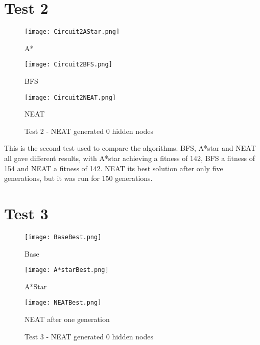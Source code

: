 \documentclass{kththesis}
\begin{document}
\section{Test 2}
 
\begin{figure}[h]
{\centering
 
\begin{minipage}{0.3\textwidth}
\centering
\texttt{[image: Circuit2AStar.png]}
\caption{A*}
\end{minipage}\hfill
\begin{minipage}{0.3\textwidth}
\centering
\texttt{[image: Circuit2BFS.png]}
\caption{BFS}
\end{minipage}\hfill
\begin{minipage}{0.3\textwidth}
\centering
\texttt{[image: Circuit2NEAT.png]}
\caption{NEAT}
\end{minipage}\hfill
\caption{Test 2 - NEAT generated 0 hidden nodes}
\label{Test 2}
}
 
\end{figure}
 
This is the second test used to compare the algorithms. BFS, A*star and NEAT all gave different results, with A*star achieving a fitness of 142, BFS a fitness of 154 and NEAT a fitness of 142. NEAT its best solution after only five generations, but it was run for 150 generations.
 
\section{Test 3}
 
\begin{figure}[h]
{\centering
 
\begin{minipage}{0.3\textwidth}
\centering
\texttt{[image: BaseBest.png]}
\caption{Base}
\end{minipage}\hfill
\begin{minipage}{0.3\textwidth}
\centering
\texttt{[image: A*starBest.png]}
\caption{A*Star}
\end{minipage}\hfill
\begin{minipage}{0.3\textwidth}
\centering
\texttt{[image: NEATBest.png]}
\caption{NEAT after one generation}
\end{minipage}\hfill
\caption{Test 3 - NEAT generated 0 hidden nodes}
\label{Test 3}
}
 
\end{figure}
 
\end{document}
